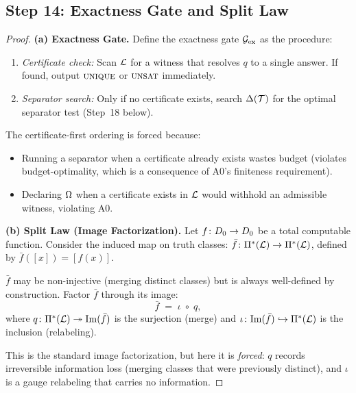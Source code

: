
\subsection{Step 14: Exactness Gate and Split Law}\label{app:step14}

\begin{proof}
\textbf{(a) Exactness Gate.}
Define the exactness gate $\mathcal{G}_{\mathrm{ex}}$ as the procedure:
\begin{enumerate}[nosep]
  \item \emph{Certificate check:} Scan $\mathcal{L}$ for a witness that
        resolves $q$ to a single answer.  If found, output $\textsc{unique}$ or
        $\textsc{unsat}$ immediately.
  \item \emph{Separator search:} Only if no certificate exists, search
        $\Delta(\mathcal{T})$ for the optimal separator test (Step~18 below).
\end{enumerate}

The certificate-first ordering is forced because:
\begin{itemize}[nosep]
  \item Running a separator when a certificate already exists wastes budget
        (violates budget-optimality, which is a consequence of A0's
        finiteness requirement).
  \item Declaring $\Omega$ when a certificate exists in $\mathcal{L}$ would
        withhold an admissible witness, violating A0.
\end{itemize}

\textbf{(b) Split Law (Image Factorization).}
Let $f \colon D_0 \to D_0$ be a total computable function.
Consider the induced map on truth classes:
$\bar{f} \colon \Pi^*(\mathcal{L}) \to \Pi^*(\mathcal{L})$, defined by
$\bar{f}([x]) = [f(x)]$.

$\bar{f}$ may be non-injective (merging distinct classes) but is always
well-defined by construction.  Factor $\bar{f}$ through its image:
\[
  \bar{f} \;=\; \iota \;\circ\; q,
\]
where $q \colon \Pi^*(\mathcal{L}) \twoheadrightarrow \mathrm{Im}(\bar{f})$ is
the surjection (merge) and $\iota \colon \mathrm{Im}(\bar{f})
\hookrightarrow \Pi^*(\mathcal{L})$ is the inclusion (relabeling).

This is the standard image factorization, but here it is \emph{forced}:
$q$ records irreversible information loss (merging classes that were
previously distinct), and $\iota$ is a gauge relabeling that carries no
information.

\end{proof}

